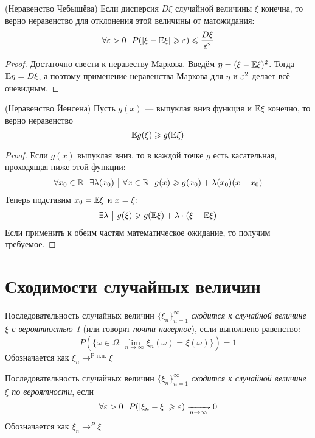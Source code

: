 \begin{proposition} (Неравенство Чебышёва)
	Если дисперсия $D\xi$ случайной величины $\xi$ конечна, то верно неравенство для отклонения этой величины от матожидания:
	\[
		\forall \varepsilon > 0\ \ P(|\xi - \mathbb{E}\xi| \geqslant \varepsilon) \leqslant \frac{D\xi}{\varepsilon^2}
	\]
\end{proposition}

\begin{proof}
	Достаточно свести к неравеству Маркова. Введём $\eta = (\xi - \mathbb{E}\xi)^2$. Тогда $\mathbb{E}\eta = D\xi$, а поэтому применение неравенства Маркова для $\eta$ и $\varepsilon^2$ делает всё очевидным.
\end{proof}

\begin{proposition} (Неравенство Йенсена)
	Пусть $g(x)$ --- выпуклая вниз функция и $\mathbb{E}\xi$ конечно, то верно неравенство
	\[
		\mathbb{E} g(\xi) \geqslant g(\mathbb{E}\xi)
	\]
\end{proposition}

\begin{proof}
	Если $g(x)$ выпуклая вниз, то в каждой точке $g$ есть касательная, проходящая ниже этой функции:
	\[
		\forall x_0 \in \mathbb{R}\ \ \exists \lambda(x_0) \ \big|\  \forall x \in \mathbb{R}\ \ g(x) \geqslant g(x_0) + \lambda(x_0)(x - x_0)
	\]
	Теперь подставим $x_0 = \mathbb{E}\xi$ и $x = \xi$:
	\[
		\exists \lambda \ \big|\  g(\xi) \geqslant g(\mathbb{E}\xi) + \lambda \cdot (\xi - \mathbb{E}\xi)
	\]
	Если применить к обеим частям математическое ожидание, то получим требуемое.
\end{proof}

\section{Сходимости случайных величин}

\begin{definition}
	Последовательность случайных величин $\{\xi_n\}_{n = 1}^\infty$ \textit{сходится к случайной величине $\xi$ с вероятностью 1} (или говорят \textit{почти наверное}), если выполнено равенство:
	\[
		P(\{\omega \in \Omega \colon \lim_{n \to \infty} \xi_n(\omega) = \xi(\omega)\}) = 1
	\]
	Обозначается как $\xi_n \to^{\text{P п.н.}} \xi$
\end{definition}

\begin{definition}
	Последовательность случайных величин $\{\xi_n\}_{n = 1}^\infty$ \textit{сходится к случайной величине $\xi$ по вероятности}, если
	\[
		\forall \eps > 0\ \ P(|\xi_n - \xi| \ge \eps) \xrightharpoondown[n \to \infty]{} 0
	\]
	Обозначается как $\xi_n \to^P \xi$
\end{definition}

